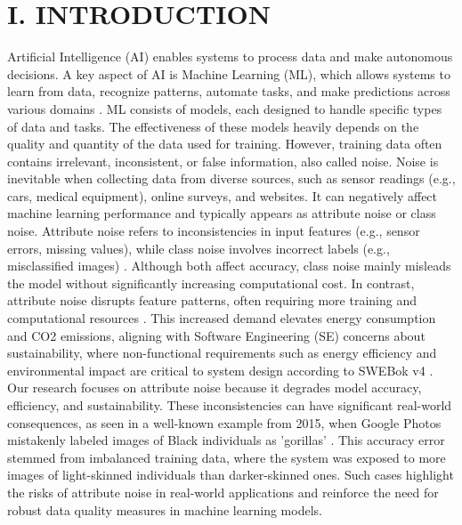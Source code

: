 \documentclass[conference]{IEEEtran}
\begin{document}
\section*{I. INTRODUCTION}
Artificial Intelligence (AI) enables systems to process data and make autonomous decisions. A key aspect of AI is Machine Learning (ML), which allows systems to learn from data, recognize patterns, automate tasks, and make predictions across various domains \cite{google_ai_ml}.
ML consists of models, each designed to handle specific types of data and tasks. The effectiveness of these models heavily depends on the quality and quantity of the data used for training.
However, training data often contains irrelevant, inconsistent, or false information, also called noise.
\newline
\newline
Noise is inevitable when collecting data from diverse sources, such as sensor readings (e.g., cars, medical equipment), online surveys, and websites. It can negatively affect machine learning performance and typically appears as attribute noise or class noise. Attribute noise refers to inconsistencies in input features (e.g., sensor errors, missing values), while class noise involves incorrect labels (e.g., misclassified images) \cite{dataheroes_noise}. 
\newline
\newline
Although both affect accuracy, class noise mainly misleads the model without significantly increasing computational cost. In contrast, attribute noise disrupts feature patterns, often requiring more training and computational resources \cite{wuzu}. This increased demand elevates energy consumption and CO2 emissions, aligning with Software Engineering (SE) concerns about sustainability, where non-functional requirements such as energy efficiency and environmental impact are critical to system design according to SWEBok v4 \cite[p. 69]{sweb}.
\newline
\newline
Our research focuses on attribute noise because it degrades model accuracy, efficiency, and sustainability. These inconsistencies can have significant real-world consequences, as seen in a well-known example from 2015, when Google Photos mistakenly labeled images of Black individuals as 'gorillas' \cite{guardian2015}. This accuracy error stemmed from imbalanced training data, where the system was exposed to more images of light-skinned individuals than darker-skinned ones. Such cases highlight the risks of attribute noise in real-world applications and reinforce the need for robust data quality measures in machine learning models.
\end{document}

